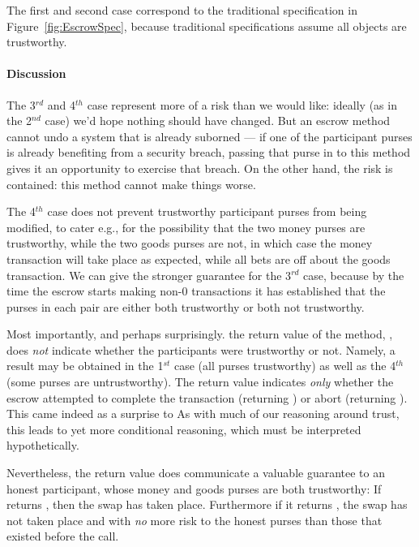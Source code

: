 The first and second case correspond  to  the
  traditional  specification in
  Figure~\ref{fig:EscrowSpec}, because traditional specifications
  assume all objects are trustworthy.

\paragraph{Discussion} The 3$^{rd}$  and 4$^{th}$ case represent  more of a risk than we would like: ideally (as
  in the 2$^{nd}$ case) we'd hope nothing should have changed. But an
  escrow method cannot undo a system that is already suborned --- if
  one of the participant purses is already benefiting from a security
  breach, passing that purse in to this method gives it an opportunity
  to exercise that breach.  On the other hand, the risk is contained:
  this method cannot make things worse.
%

The %
 4$^{th}$ case does not prevent trustworthy participant purses from
 being modified, to cater e.g., for the possibility that the two money
 purses are  trustworthy, while the two goods purses are not, in which
 case  the money transaction will take place as expected,  while all
 bets are off about the goods transaction. 
 We can give the stronger guarantee for the 3$^{rd}$ case, because by
 the time the escrow starts making non-$0$ transactions  it has established that the purses in each
 pair are either both trustworthy or both not trustworthy. 

Most importantly, and perhaps surprisingly.
the return value of the method, , does {\em not} indicate
whether the participants were trustworthy or not. Namely, a 
result may be obtained in the 1$^{st}$ case (all purses trustworthy)
as well as the 4$^{th}$ (some purses are untrustworthy).  The
return value indicates {\em only} whether the escrow attempted to complete the
transaction (returning ) or abort (returning
). This came indeed
  as a surprise to 
As with much of our reasoning around trust,
this leads to yet more conditional reasoning, which must be
interpreted hypothetically.

Nevertheless, the return value does communicate a valuable guarantee to an honest
participant,   whose money and goods purses are both
trustworthy:  If  returns , then the swap has taken
place. Furthermore if it returns , the swap has not taken
place and with \textit{no} more risk to the honest purses than those that existed before the call.




